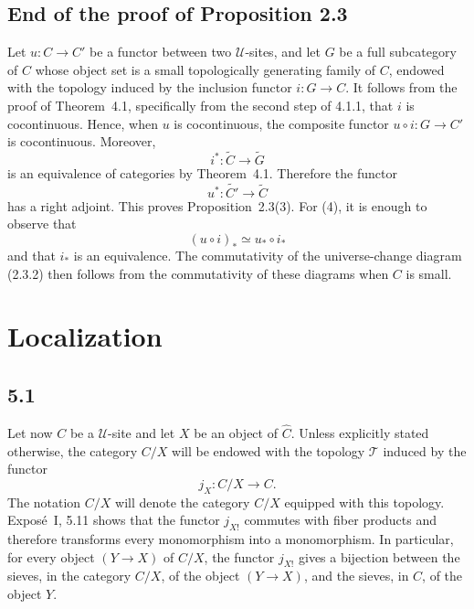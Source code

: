 \documentclass[11pt]{article}
\newcommand{\U}{\mathcal{U}}
\newcommand{\T}{\mathcal{T}}
\begin{document}
\subsection{End of the proof of Proposition 2.3}

Let \(u:C\to C'\) be a functor between two \(\U\)-sites, and let \(G\) be a full subcategory of \(C\) whose object set is a small topologically generating family of \(C\), endowed with the topology induced by the inclusion functor \(i:G\to C\). It follows from the proof of Theorem~4.1, specifically from the second step of 4.1.1, that \(i\) is cocontinuous. Hence, when \(u\) is cocontinuous, the composite functor \(u\circ i:G\to C'\) is cocontinuous. Moreover,
\[
i^*:\widetilde C\to\widetilde G
\]
is an equivalence of categories by Theorem~4.1. Therefore the functor
\[
u^*:\widetilde{C'}\to\widetilde C
\]
has a right adjoint. This proves Proposition~2.3(3). For (4), it is enough to observe that
\[
(u\circ i)_*\simeq u_*\circ i_*
\]
and that \(i_*\) is an equivalence. The commutativity of the universe-change diagram (2.3.2) then follows from the commutativity of these diagrams when \(C\) is small.

\section{Localization}

\subsection*{5.1}
Let now \(C\) be a \(\U\)-site and let \(X\) be an object of \(\widehat C\). Unless explicitly stated otherwise, the category \(C/X\) will be endowed with the topology \(\T\) induced by the functor
\[
j_X:C/X\to C.
\]
The notation \(C/X\) will denote the category \(C/X\) equipped with this topology. Expos\'e~I, 5.11 shows that the functor \(j_{X!}\) commutes with fiber products and therefore transforms every monomorphism into a monomorphism. In particular, for every object \((Y\to X)\) of \(C/X\), the functor \(j_{X!}\) gives a bijection between the sieves, in the category \(C/X\), of the object \((Y\to X)\), and the sieves, in \(C\), of the object \(Y\).
\end{document}
